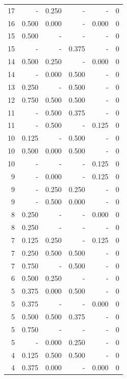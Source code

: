 \documentclass[a4paper]{article}\usepackage[]{graphicx}\usepackage[]{color}
\begin{document}
\begin{table}[ht]
\begin{tabular}{rrrrrr}
  17 & - & 0.250 & - & - & 0 \\ 
  16 & 0.500 & 0.000 & - & 0.000 & 0 \\ 
   \rowcolor{nullColor} 15 & 0.500 & - & - & - & 0 \\ 
   \rowcolor{sosoColor} 15 & - & - & 0.375 & - & 0 \\ 
  14 & 0.500 & 0.250 & - & 0.000 & 0 \\ 
   \rowcolor{badColor} 14 & - & 0.000 & 0.500 & - & 0 \\ 
   \rowcolor{sosoColor} 13 & 0.250 & - & 0.500 & - & 0 \\ 
   \rowcolor{goodColor} 12 & 0.750 & 0.500 & 0.500 & - & 0 \\ 
  11 & - & 0.500 & 0.375 & - & 0 \\ 
  11 & - & 0.500 & - & 0.125 & 0 \\ 
   \rowcolor{sosoColor} 10 & 0.125 & - & 0.500 & - & 0 \\ 
   \rowcolor{badColor} 10 & 0.500 & 0.000 & 0.500 & - & 0 \\ 
   \rowcolor{nullColor} 10 & - & - & - & 0.125 & 0 \\ 
  9 & - & 0.000 & - & 0.125 & 0 \\ 
   \rowcolor{goodColor} 9 & - & 0.250 & 0.250 & - & 0 \\ 
   \rowcolor{badColor} 9 & - & 0.500 & 0.000 & - & 0 \\ 
   \rowcolor{nullColor} 8 & 0.250 & - & - & 0.000 & 0 \\ 
   \rowcolor{nullColor} 8 & 0.250 & - & - & - & 0 \\ 
  7 & 0.125 & 0.250 & - & 0.125 & 0 \\ 
   \rowcolor{goodColor} 7 & 0.250 & 0.500 & 0.500 & - & 0 \\ 
   \rowcolor{sosoColor} 7 & 0.750 & - & 0.500 & - & 0 \\ 
  6 & 0.500 & 0.250 & - & - & 0 \\ 
   \rowcolor{badColor} 5 & 0.375 & 0.000 & 0.500 & - & 0 \\ 
   \rowcolor{nullColor} 5 & 0.375 & - & - & 0.000 & 0 \\ 
  5 & 0.500 & 0.500 & 0.375 & - & 0 \\ 
   \rowcolor{nullColor} 5 & 0.750 & - & - & - & 0 \\ 
   \rowcolor{badColor} 5 & - & 0.000 & 0.250 & - & 0 \\ 
   \rowcolor{goodColor} 4 & 0.125 & 0.500 & 0.500 & - & 0 \\ 
  4 & 0.375 & 0.000 & - & 0.000 & 0 \\ 

\end{tabular}
\end{table}
\end{document}
